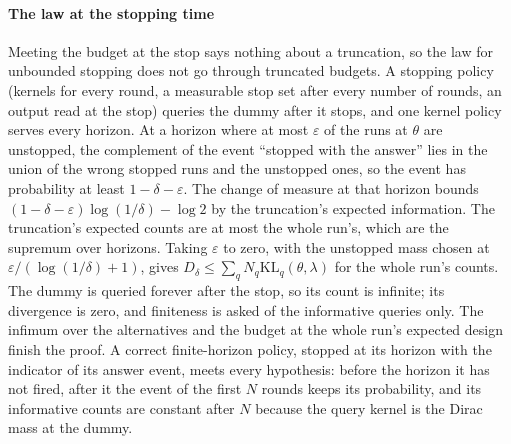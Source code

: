 \paragraph{The law at the stopping time} Meeting the budget at the stop says nothing about a
truncation, so the law for unbounded stopping does not go through truncated budgets. A stopping
policy (kernels for every round, a measurable stop set after every number of rounds, an output
read at the stop) queries the dummy after it stops, and one kernel policy serves every horizon.
At a horizon where at most $\varepsilon$ of the runs at $\theta$ are unstopped, the complement of
the event ``stopped with the answer'' lies in the union of the wrong stopped runs and the
unstopped ones, so the event has probability at least $1-\delta-\varepsilon$. The change of
measure at that horizon bounds $(1-\delta-\varepsilon)\log(1/\delta)-\log2$ by the truncation's
expected information. The truncation's expected counts are at most the whole run's, which are
the supremum over horizons. Taking $\varepsilon$ to zero, with the unstopped mass chosen at
$\varepsilon/(\log(1/\delta)+1)$, gives $D_\delta\le\sum_qN_q\mathrm{KL}_q(\theta,\lambda)$ for the
whole run's counts. The dummy is queried forever after the stop, so its count is infinite; its
divergence is zero, and finiteness is asked of the informative queries only. The infimum over
the alternatives and the budget at the whole run's expected design finish the proof. A correct
finite-horizon policy, stopped at its horizon with the indicator of its answer event, meets every
hypothesis: before the horizon it has not fired, after it the event of the first $N$ rounds keeps
its probability, and its informative counts are constant after $N$ because the query kernel is
the Dirac mass at the dummy.


